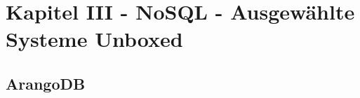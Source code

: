 \chapter{Kapitel III - NoSQL - Ausgewählte Systeme Unboxed}
\setcounter{section}{7}
\section{ArangoDB}
